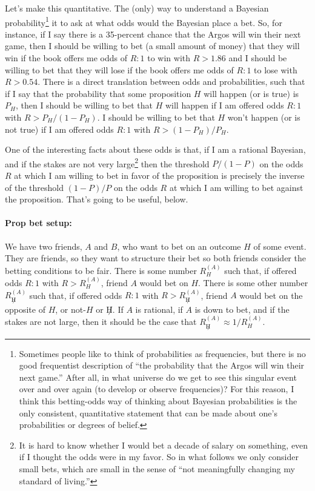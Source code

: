 \documentclass{article}
\begin{document}
Let's make this quantitative.
The (only) way to understand a Bayesian probability\footnote{%
Sometimes people like to think of probabilities as frequencies, but there is no good frequentist description
of ``the probability that the Argos will win their next game.''
After all, in what universe do we get to see this singular event over and over again (to develop or observe frequencies)?
For this reason, I think this betting-odds way of thinking about Bayesian probabilities is the only consistent,
quantitative statement that can be made about one's probabilities or degrees of belief.}
it to ask at what odds would the Bayesian place a bet.
So, for instance, if I say there is a 35-percent chance that the Argos will win their next game,
then I should be willing to bet (a small amount of money) that they will win if the book offers me odds
of $R:1$ to win with $R>1.86$
and I should be willing to bet that they will lose if the book offers
me odds of $R:1$ to lose with $R>0.54$.
There is a direct translation between odds and probabilities, such that if I say that the probability
that some proposition $H$ will happen (or is true) is $P_H$, then I should be willing to bet that $H$
will happen if I am offered odds $R:1$ with $R>P_H/(1 - P_H)$.
I should be willing to bet that $H$ won't happen (or is not true) if I am offered odds $R:1$ with $R>(1-P_H)/P_H$.

One of the interesting facts about these odds is that, if I am a rational Bayesian,
and if the stakes are not very large\footnote{%
It is hard to know whether I would bet a decade of salary on something, even if I thought the odds were in my favor.
So in what follows we only consider small bets, which are small in the sense of ``not meaningfully changing my standard of living.''}
then the threshold $P/(1-P)$ on the odds $R$ at which I am willing to bet in favor of the proposition is
precisely the inverse of the threshold $(1-P)/P$ on the odds $R$ at which I am willing to bet against the proposition.
That's going to be useful, below.

\paragraph{Prop bet setup:}
We have two friends, $A$ and $B$, who want to bet on an outcome $H$ of some event.
They are friends, so they want to structure their bet so both friends consider the betting conditions to be fair.
There is some number $R_H^{(A)}$ such that, if offered odds $R:1$ with $R>R_H^{(A)}$, friend $A$ would bet on $H$.
There is some other number $R_{\not H}^{(A)}$ such that, if offered odds $R:1$ with $R>R_{\not H}^{(A)}$, friend $A$
would bet on the opposite of $H$, or not-$H$ or $\not H$.
If $A$ is rational, if $A$ is down to bet, and if the stakes are not large, then it should be the case that
$R_{\not H}^{(A)} \approx 1/R_H^{(A)}$.
\end{document}
